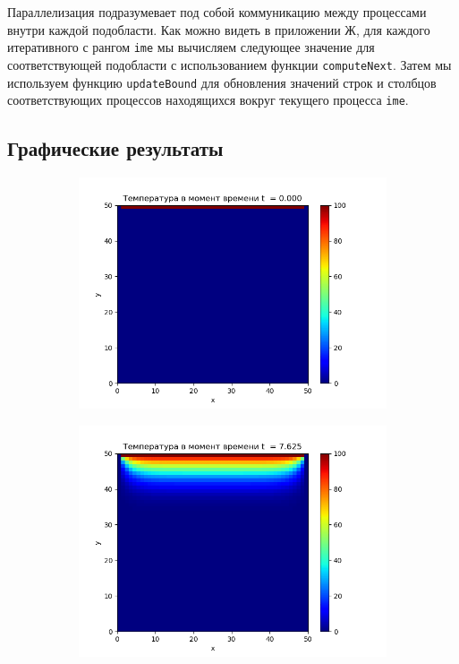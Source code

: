 \documentclass[a4paper]{extarticle}
\begin{document}
Параллелизация подразумевает под собой коммуникацию между процессами внутри каждой подобласти. Как можно видеть в приложении Ж, для каждого итеративного с рангом \texttt{ime} мы вычисляем следующее значение для соответствующей подобласти с использованием функции \texttt{computeNext}. Затем мы используем функцию \texttt{updateBound} для обновления значений строк и столбцов соответствующих процессов находящихся вокруг текущего процесса \texttt{ime}.

\newpage

\subsection{Графические результаты}

\begin{figure}[h!]
\begin{subfigure}[b]{0.5\textwidth}
	 \includegraphics[width=\textwidth]{hes_pic-0.png}
\end{subfigure}
\hfill
\begin{subfigure}[b]{0.5\textwidth}
	\includegraphics[width=\textwidth]{hes_pic-61.png}
\end{subfigure}


\end{figure}
\end{document}

